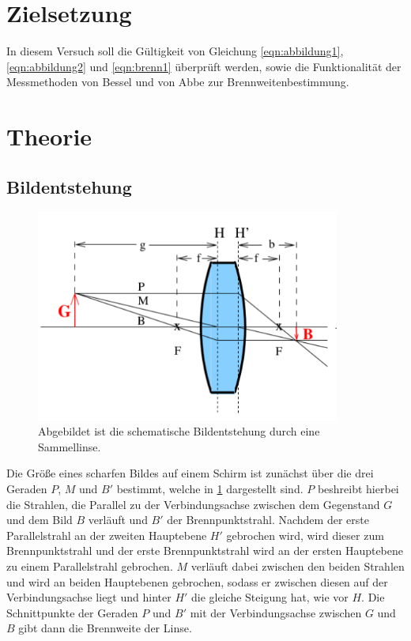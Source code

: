 \section{Zielsetzung}
In diesem Versuch soll die Gültigkeit von Gleichung \ref{eqn:abbildung1}, \ref{eqn:abbildung2} und \ref{eqn:brenn1} überprüft werden, sowie die Funktionalität der Messmethoden von Bessel und von Abbe zur Brennweitenbestimmung.


\section{Theorie}
\label{sec:Theorie}
\subsection{Bildentstehung}
    \begin{figure}
        \centering
        \includegraphics[width=10cm]{Bilder/veranschaulichung.png}
        \caption{Abgebildet ist die schematische Bildentstehung durch eine Sammellinse.}
        \label{fig:veranschaulichung}
    \end{figure}

    \noindent Die Größe eines scharfen Bildes auf einem Schirm ist zunächst über die drei Geraden $P$, $M$ und $B'$ bestimmt, welche in \ref{fig:veranschaulichung} dargestellt sind. $P$ beshreibt hierbei die Strahlen, die Parallel zu der Verbindungsachse
    zwischen dem Gegenstand $G$ und dem Bild $B$ verläuft und $B'$ der Brennpunktstrahl. Nachdem der erste Parallelstrahl an der zweiten Hauptebene $H'$ gebrochen wird, wird dieser zum Brennpunktstrahl und der erste Brennpunktstrahl wird an der ersten
    Hauptebene zu einem Parallelstrahl gebrochen. $M$ verläuft dabei zwischen den beiden Strahlen und wird an beiden Hauptebenen gebrochen, sodass er zwischen diesen auf der Verbindungsachse liegt und hinter $H'$ die gleiche Steigung hat, wie vor $H$.
    Die Schnittpunkte der Geraden $P$ und $B'$ mit der Verbindungsachse zwischen $G$ und $B$ gibt dann die Brennweite der Linse.

